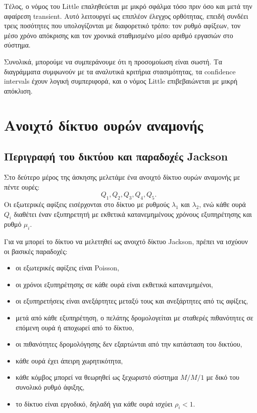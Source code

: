 \documentclass{article}
\begin{document}
Τέλος, ο νόμος του Little επαληθεύεται με μικρό σφάλμα τόσο πριν όσο και μετά την αφαίρεση transient. Αυτό λειτουργεί ως επιπλέον έλεγχος ορθότητας, επειδή συνδέει τρεις ποσότητες που υπολογίζονται με διαφορετικό τρόπο: τον ρυθμό αφίξεων, τον μέσο χρόνο απόκρισης και τον χρονικά σταθμισμένο μέσο αριθμό εργασιών στο σύστημα.

Συνολικά, μπορούμε να συμπεράνουμε ότι η προσομοίωση είναι σωστή. Τα διαγράμματα συμφωνούν με τα αναλυτικά κριτήρια στασιμότητας, τα confidence intervals έχουν λογική συμπεριφορά, και ο νόμος Little επιβεβαιώνεται με μικρή απόκλιση.

\newpage
\section{Ανοιχτό δίκτυο ουρών αναμονής}

\subsection{Περιγραφή του δικτύου και παραδοχές Jackson}

Στο δεύτερο μέρος της άσκησης μελετάμε ένα ανοιχτό δίκτυο ουρών αναμονής με πέντε ουρές:
\[
    Q_1,Q_2,Q_3,Q_4,Q_5.
\]
Οι εξωτερικές αφίξεις εισέρχονται στο δίκτυο με ρυθμούς $\lambda_1$ και $\lambda_2$, ενώ κάθε ουρά $Q_i$ διαθέτει έναν εξυπηρετητή με εκθετικά κατανεμημένους χρόνους εξυπηρέτησης και ρυθμό $\mu_i$.

Για να μπορεί το δίκτυο να μελετηθεί ως ανοιχτό δίκτυο Jackson, πρέπει να ισχύουν οι βασικές παραδοχές:
\begin{itemize}
    \item οι εξωτερικές αφίξεις είναι Poisson,
    \item οι χρόνοι εξυπηρέτησης σε κάθε ουρά είναι εκθετικά κατανεμημένοι,
    \item οι εξυπηρετήσεις είναι ανεξάρτητες μεταξύ τους και ανεξάρτητες από τις αφίξεις,
    \item μετά από κάθε εξυπηρέτηση, ο πελάτης δρομολογείται με σταθερές πιθανότητες σε επόμενη ουρά ή αποχωρεί από το δίκτυο,
    \item οι πιθανότητες δρομολόγησης δεν εξαρτώνται από την κατάσταση του δικτύου,
    \item κάθε ουρά έχει άπειρη χωρητικότητα,
    \item κάθε κόμβος μπορεί να θεωρηθεί ως ξεχωριστό σύστημα $M/M/1$ με δικό του συνολικό ρυθμό άφιξης,
    \item το δίκτυο είναι εργοδικό, δηλαδή για κάθε ουρά ισχύει $\rho_i<1$.
\end{itemize}
\end{document}
